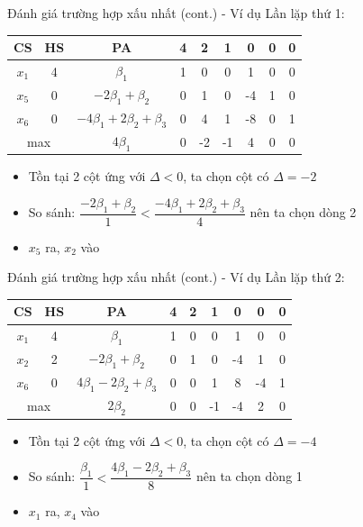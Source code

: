 \documentclass[10pt]{beamer}
\begin{document}
\begin{frame}{Đánh giá trường hợp xấu nhất (cont.) - Ví dụ}
Lần lặp thứ 1:
\begin{table}[H]
\centering
\begin{tabular}{|c|c|c|c|c|c|c|c|c|}
\hline
CS & HS & PA & 4 & 2 & 1 & 0 & 0 & 0 \\
\hline
$x_1$ & 4 & $\beta_1$ & 1 & 0 & 0 & 1 & 0 & 0 \\
$x_5$ & 0 & $-2\beta_1 + \beta_2$ & 0 & 1 & 0 & -4 & 1 & 0 \\
$x_6$ & 0 & $-4\beta_1 + 2\beta_2 + \beta_3$ & 0 & 4 & 1 & -8 & 0 & 1 \\
\hline
\multicolumn{2}{|c|}{max}
& $4\beta_1$ & 0 & -2 & -1 & 4 & 0 & 0 \\
\hline
\end{tabular}
\end{table}
\begin{itemize}
\item Tồn tại 2 cột ứng với $\Delta < 0$, ta chọn cột có $\Delta = -2$
\item So sánh: $\dfrac{-2\beta_1 + \beta_2}{1} < \dfrac{-4\beta_1 + 2\beta_2 + \beta_3}{4}$ nên ta chọn dòng 2
\item $x_5$ ra, $x_2$ vào
\end{itemize}
\end{frame}

\begin{frame}{Đánh giá trường hợp xấu nhất (cont.) - Ví dụ}
Lần lặp thứ 2:
\begin{table}[H]
\centering
\begin{tabular}{|c|c|c|c|c|c|c|c|c|}
\hline
CS & HS & PA & 4 & 2 & 1 & 0 & 0 & 0 \\
\hline
$x_1$ & 4 & $\beta_1$ & 1 & 0 & 0 & 1 & 0 & 0 \\
$x_2$ & 2 & $-2\beta_1 + \beta_2$ & 0 & 1 & 0 & -4 & 1 & 0 \\
$x_6$ & 0 & $4\beta_1 - 2\beta_2 + \beta_3$ & 0 & 0 & 1 & 8 & -4 & 1 \\
\hline
\multicolumn{2}{|c|}{max}
& $2\beta_2$ & 0 & 0 & -1 & -4 & 2 & 0 \\
\hline
\end{tabular}
\end{table}
\begin{itemize}
\item Tồn tại 2 cột ứng với $\Delta < 0$, ta chọn cột có $\Delta = -4$
\item So sánh: $\dfrac{\beta_1}{1} < \dfrac{4\beta_1 - 2\beta_2 + \beta_3}{8}$ nên ta chọn dòng 1
\item $x_1$ ra, $x_4$ vào
\end{itemize}
\end{frame}
\end{document}
